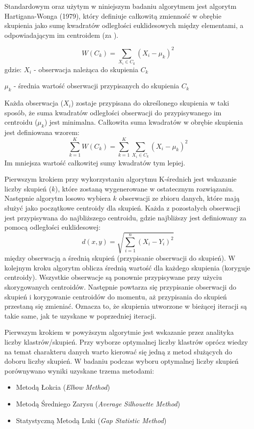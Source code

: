 \documentclass{amuthesis}
\begin{document}
Standardowym oraz użytym w niniejszym badaniu algorytmem jest algorytm Hartigana-Wonga (1979), który definiuje całkowitą zmienność w obrębie skupienia jako sumę kwadratów odległości euklidesowych między elementami, a odpowiadającym im centroidem (za \textcite{k-srednich_internet}).

\[ W(C_k) = \sum_{{X_i}\in C_k}(X_i - \mu_k)^2
\]
gdzie:
\(X_i\) - obserwacja należąca do skupienia \(C_k\)

\(\mu_k\) - średnia wartość obserwacji przypisanych do skupienia \(C_k\)

Każda obserwacja (\(X_i\)) zostaje przypisana do określonego skupienia w taki sposób, że suma kwadratów odległości obserwacji do przypisywanego im centroidu (\(\mu_k\)) jest minimalna.
Całkowita suma kwadratów w obrębie skupienia jest definiowana wzorem:
\[ \sum_{k=1}^K W(C_k) = \sum_{k=1}^K \sum_{{X_i}\in C_k}(X_i - \mu_k)^2
\]
Im mniejsza wartość całkowitej sumy kwadratów tym lepiej.

Pierwszym krokiem przy wykorzystaniu algorytmu K-średnich jest wskazanie liczby skupień (\(k\)), które zostaną wygenerowane w ostatecznym rozwiązaniu.
Następnie algorytm losowo wybiera \(k\) obserwacji ze zbioru danych, które mają służyć jako początkowe centroidy dla skupień.
Każda z pozostałych obserwacji jest przypisywana do najbliższego centroidu, gdzie najbliższy jest definiowany za pomocą odległości euklidesowej:
\[ d (x,y) = \sqrt{\sum_{i=1}^n(X_i - Y_i)^2}
\]
między obserwacją a średnią skupień (przypisanie obserwacji do skupień).
W kolejnym kroku algorytm oblicza średnią wartość dla każdego skupienia (koryguje centroidy).
Wszystkie obserwacje są ponownie przypisywane przy użyciu skorygowanych centroidów.
Następnie powtarza się przypisanie obserwacji do skupień i korygowanie centroidów do momentu, aż przypisania do skupień przestaną się zmieniać.
Oznacza to, że skupienia utworzone w bieżącej iteracji są takie same, jak te uzyskane w poprzedniej iteracji.

Pierwszym krokiem w powyższym algorytmie jest wskazanie przez analityka liczby klastrów/skupień.
Przy wyborze optymalnej liczby klastrów oprócz wiedzy na temat charakteru danych warto kierować się jedną z metod służących do doboru liczby skupień.
W badaniu podczas wyboru optymalnej liczby skupień porównywano wyniki uzyskane trzema metodami:

\begin{itemize}
\tightlist
\item
  Metodą Łokcia (\emph{Elbow Method})
\item
  Metodą Średniego Zarysu (\emph{Average Silhouette Method})
\item
  Statystyczną Metodą Luki (\emph{Gap Statistic Method})
\end{itemize}
\end{document}
